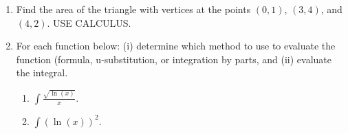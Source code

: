 \documentclass[12pt]{article}
\begin{document}
\begin{enumerate}
\item Find the area of the triangle with vertices at the points $(0,1)$, $(3,4)$, and $(4,2)$. USE
CALCULUS.

\item For each function below: (i) determine which method to use to evaluate the function
(formula, u-substitution, or integration by parts, and (ii) evaluate the integral.
\begin{enumerate}
\item $\int \frac{\sqrt{\ln(x)}}{x}$.


\item $\int \left(\ln(x)\right)^2$.


\end{enumerate}


\end{enumerate}
\end{document}
